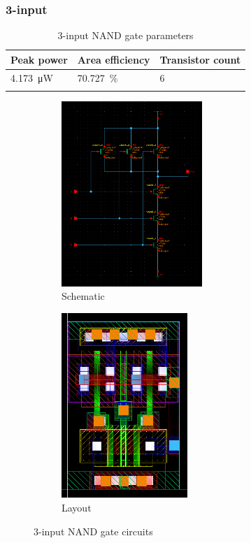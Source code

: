 \subsubsection{3-input}
\begin{xltabular}{\textwidth}{YYY}
    \hline
    Peak power & Area efficiency & Transistor count \\
    \hline
    \qty{4.173}{\uW} & \qty{70.727}{\percent} & 6 \\
    \hline    
    \caption{3-input NAND gate parameters}
\end{xltabular}
\begin{figure}[H]
    \begin{subfigure}{0.6\textwidth}
        \centering
        \includegraphics[width=\textwidth,height=7cm,keepaspectratio]{./figures/nand3/schematic.png}
        \caption{Schematic}\label{fig:nand3schematic}
    \end{subfigure}
    \hfill
    \begin{subfigure}{0.4\textwidth}
        \centering
        \includegraphics[width=\textwidth,height=7cm,keepaspectratio]{./figures/nand3/layout.png}
        \caption{Layout}\label{fig:nand3layout}
    \end{subfigure}
    \caption{3-input NAND gate circuits}
    \end{figure}
    
